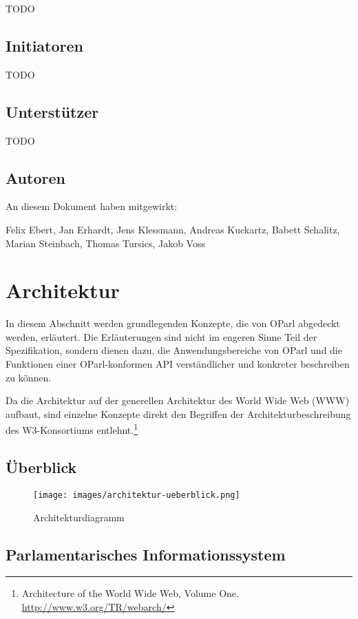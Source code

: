 \documentclass[,a4paper]{article}
\makeatletter
\def\maxwidth{\ifdim\Gin@nat@width>\linewidth\linewidth
\else\Gin@nat@width\fi}
\let\Oldincludegraphics\includegraphics
\renewcommand{\includegraphics}[1]{\Oldincludegraphics[width=\maxwidth]{#1}}
\makeatother
\begin{document}
TODO

\subsection{Initiatoren}\label{initiatoren}

TODO

\subsection{Unterstützer}\label{unterstuxfctzer}

TODO

\subsection{Autoren}\label{autoren}

An diesem Dokument haben mitgewirkt:

Felix Ebert, Jan Erhardt, Jens Klessmann, Andreas Kuckartz, Babett
Schalitz, Marian Steinbach, Thomas Tursics, Jakob Voss

\section{Architektur}\label{architektur}

In diesem Abschnitt werden grundlegenden Konzepte, die von OParl
abgedeckt werden, erläutert. Die Erläuterungen sind nicht im engeren
Sinne Teil der Spezifikation, sondern dienen dazu, die
Anwendungsbereiche von OParl und die Funktionen einer OParl-konformen
API verständlicher und konkreter beschreiben zu können.

Da die Architektur auf der generellen Architektur des World Wide Web
(WWW) aufbaut, sind einzelne Konzepte direkt den Begriffen der
Architekturbeschreibung des W3-Konsortiums entlehnt.\footnote{Architecture
  of the World Wide Web, Volume One. \url{http://www.w3.org/TR/webarch/}}

\subsection{Überblick}\label{uxfcberblick}

\begin{figure}[htbp]
\centering
\texttt{[image: images/architektur-ueberblick.png]}
\caption{Architekturdiagramm}
\end{figure}

\subsection{Parlamentarisches
Informationssystem}\label{parlamentarischesux5finfosystem}
\end{document}
